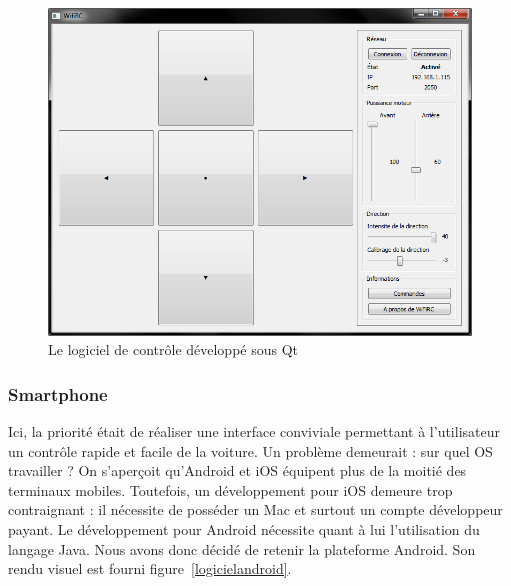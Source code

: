 \documentclass[a4paper,12pt]{report}
\begin{document}
\begin{figure}[!h]
	\begin{center}
		\includegraphics[scale=0.4]{images/logicielqt.png}
	\end{center}
	\caption{Le logiciel de contrôle développé sous Qt} 
	\label{logicielqt}
\end{figure}

			\subsubsection{Smartphone}
			Ici, la priorité était de réaliser une interface conviviale permettant à l’utilisateur un contrôle rapide et facile de la voiture. Un problème demeurait : sur quel OS travailler ? On s’aperçoit qu’Android et iOS équipent plus de la moitié des terminaux mobiles. Toutefois, un développement pour iOS demeure trop contraignant : il nécessite de posséder un Mac et surtout un compte développeur payant. Le développement pour Android nécessite quant à lui l’utilisation du langage Java.
Nous avons donc décidé de retenir la plateforme Android. Son rendu visuel est fourni figure~\ref{logicielandroid}. %
\end{document}
